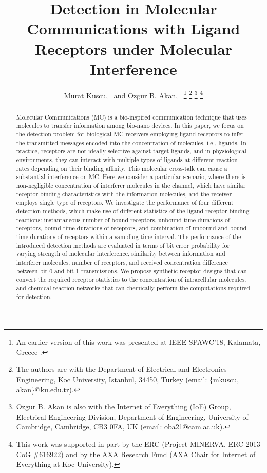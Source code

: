 \documentclass[twocolumn]{IEEEtran}
\begin{document}
\title{Detection in Molecular Communications with Ligand Receptors under Molecular Interference}
\author{Murat Kuscu,~
        and Ozgur B. Akan,~
       \thanks{An earlier version of this work was presented at IEEE SPAWC'18, Kalamata, Greece \cite{muzio2018selective}. }
       \thanks{The authors are with the Department of Electrical and Electronics Engineering, Koc University, Istanbul, 34450, Turkey  (email: \{mkuscu, akan\}@ku.edu.tr).}
       \thanks{Ozgur B. Akan is also with the Internet of Everything (IoE) Group, Electrical Engineering Division, Department of Engineering, University of Cambridge, Cambridge, CB3 0FA, UK (email: oba21@cam.ac.uk).}
\thanks{This work was supported in part by the ERC (Project MINERVA, ERC-2013-CoG \#616922) and by the AXA Research Fund (AXA Chair for Internet of Everything at Koc University).}}%


\maketitle


\begin{abstract}
	Molecular Communications (MC) is a bio-inspired communication technique that uses molecules to transfer information among bio-nano devices. In this paper, we focus on the detection problem for biological MC receivers employing ligand receptors to infer the transmitted messages encoded into the concentration of molecules, i.e., ligands. In practice, receptors are not ideally selective against target ligands, and in physiological environments, they can interact with multiple types of ligands at different reaction rates depending on their binding affinity. This molecular cross-talk can cause a substantial interference on MC. Here we consider a particular scenario, where there is non-negligible concentration of interferer molecules in the channel, which have similar receptor-binding characteristics with the information molecules, and the receiver employs single type of receptors. We investigate the performance of four different detection methods, which make use of different statistics of the ligand-receptor binding reactions: instantaneous number of bound receptors, unbound time durations of receptors, bound time durations of receptors, and combination of unbound and bound time durations of receptors within a sampling time interval. The performance of the introduced detection methods are evaluated in terms of bit error probability for varying strength of molecular interference, similarity between information and interferer molecules, number of receptors, and received concentration difference between bit-0 and bit-1 transmissions. We propose synthetic receptor designs that can convert the required receptor statistics to the concentration of intracellular molecules, and chemical reaction networks that can chemically perform the computations required for detection. 
	
\end{abstract}
\end{document}
